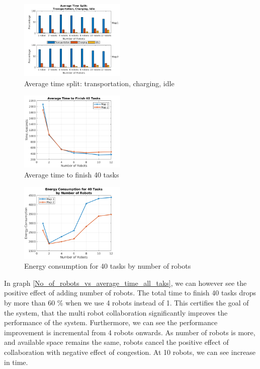 \documentclass[journal]{IEEEtran}
\begin{document}
\begin{figure}[h]
	\centering
	\includegraphics[width=0.45\textwidth]{resources/Graphs-paper/graph7.png}
	\caption{Average time split: transportation, charging, idle}
	\label{fig:trans_charg_idle}
\end{figure}

\begin{figure}[h]
	\centering
	\includegraphics[width=0.45\textwidth]{resources/Graphs-paper/graph6.png}
	\caption{Average time to finish 40 tasks}
	\label{fig:time_to_finish_40_tasks}
\end{figure}

\begin{figure}[h]
	\centering
	\includegraphics[width=0.45\textwidth]{resources/Graphs-paper/graph8.png}
	\caption{Energy consumption for 40 tasks by number of robots}
	\label{fig:energy_consumption}
\end{figure}


In graph \ref{No_of_robots_vs_average_time_all_taks}, we can however see the positive effect of adding number of robots. The total time to finish 40 tasks drops by more than 60 \% when we use 4 robots instead of 1. This certifies the goal of the system, that the multi robot collaboration significantly improves the performance of the system. Furthermore, we can see the performance improvement is incremental from 4 robots onwards. As number of robots is more, and available space remains the same, robots cancel the positive effect of collaboration with negative effect of congestion. At 10 robots, we can see increase in time.
\end{document}

